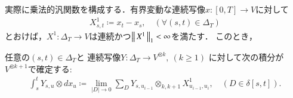 	実際に乗法的汎関数を構成する．有界変動な連続写像$x:[0,T] \longrightarrow V$に対して
	\begin{align}
		X^1_{s,t} \coloneqq x_t - x_s,
		\quad (\forall (s,t) \in \Delta_T)
	\end{align}
	とおけば，$X^1:\Delta_T \longrightarrow V$は連続かつ$\left\|\, X^1\, \right\|_{1} < \infty$を満たす．
	このとき，
	\begin{screen}
		\begin{lem}\label{lem:def_integration_of_continuous_mapping_by_X_1}
			任意の$(s,t) \in \Delta_T$と
			連続写像$Y:\Delta_T \longrightarrow V^{\otimes k},\ (k \geq 1)$
			に対して次の積分が$V^{\otimes k+1}$で確定する:
			\begin{align}
				\int_s^t Y_{s,u} \otimes d x_u
				\coloneqq \lim_{|D| \to 0} \sum_{D} Y_{s,u_{i-1}} \otimes_{k,k+1} X^1_{u_{i-1},u_i},
				\quad (D \in \delta[s,t]).
				\label{eq:def_integration_of_continuous_mapping_by_X_1}
			\end{align}
		\end{lem}
	\end{screen}
	
